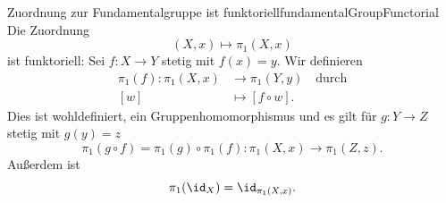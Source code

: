 \documentclass[language=ngerman]{TemplateLecture} %
\begin{document}
\begin{thm}{Zuordnung zur Fundamentalgruppe ist funktoriell}{fundamentalGroupFunctorial}
    Die Zuordnung 
    \begin{equation*}
        (X,x) \mapsto \pi_1(X,x)
    \end{equation*}
    ist funktoriell: Sei $f: X \to Y$ stetig mit $f(x) = y$. Wir definieren 
    \begin{align*}
        \pi_1(f): \pi_1(X, x) &\longrightarrow \pi_1(Y,y) \quad \text{durch} \\
        [w] &\longmapsto [f \circ w].
    \end{align*}
    Dies ist wohldefiniert, ein Gruppenhomomorphismus und es gilt für $g: Y \to Z$ stetig mit $g(y) = z$
    \begin{equation*}
        \pi_1(g \circ f) = \pi_1(g) \circ \pi_1(f): \pi_1(X,x) \longrightarrow \pi_1(Z,z).
    \end{equation*} 
    Außerdem ist 
    \begin{equation*}
        \pi_1(\id_X) = \id_{\pi_1(X,x)}.
    \end{equation*}
\end{thm}
\end{document}
